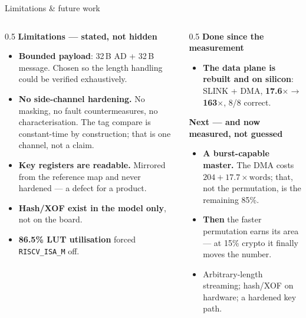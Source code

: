 \documentclass[aspectratio=169,11pt]{beamer}
\newcommand{\code}[1]{\texttt{\small #1}}
\begin{document}
\begin{frame}{Limitations \& future work}
\begin{columns}[T]
\begin{column}{0.5\textwidth}
{\small\color{warnamber}\textbf{Limitations --- stated, not hidden}}
\begin{itemize}\footnotesize
\item \textbf{Bounded payload}: 32\,B AD + 32\,B message. Chosen so the length
      handling could be verified exhaustively.
\item \textbf{No side-channel hardening.} No masking, no fault countermeasures,
      no characterisation. The tag compare is constant-time by construction; that
      is one channel, not a claim.
\item \textbf{Key registers are readable.} Mirrored from the reference map and
      never hardened --- a defect for a product.
\item \textbf{Hash/XOF exist in the model only}, not on the board.
\item \textbf{86.5\% LUT utilisation} forced \code{RISCV\_ISA\_M} off.
\end{itemize}
\end{column}
\begin{column}{0.5\textwidth}
{\small\color{okgreen}\textbf{Done since the measurement}}
\begin{itemize}\footnotesize
\item \textbf{The data plane is rebuilt and on silicon}: SLINK + DMA,
      \textbf{17.6$\times \rightarrow$ 163$\times$}, 8/8 correct.
\end{itemize}
\vspace{1mm}
{\small\color{docblue}\textbf{Next --- and now measured, not guessed}}
\begin{itemize}\footnotesize
\item \textbf{A burst-capable master.} The DMA costs $204 + 17.7 \times
      \text{words}$; that, not the permutation, is the remaining 85\%.
\item \textbf{Then} the faster permutation earns its area --- at 15\% crypto it
      finally moves the number.
\item Arbitrary-length streaming; hash/XOF on hardware; a hardened key path.
\end{itemize}
\end{column}
\end{columns}
\end{frame}
\end{document}
